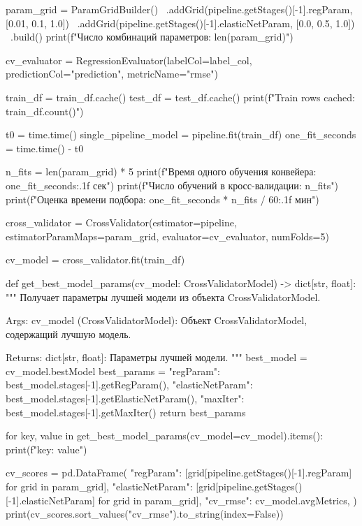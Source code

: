\begin{code}
param_grid = ParamGridBuilder() \
    .addGrid(pipeline.getStages()[-1].regParam, [0.01, 0.1, 1.0]) \
    .addGrid(pipeline.getStages()[-1].elasticNetParam, [0.0, 0.5, 1.0]) \
    .build()
print(f"Число комбинаций параметров: {len(param_grid)}")

cv_evaluator = RegressionEvaluator(labelCol=label_col,
                                   predictionCol="prediction",
                                   metricName="rmse")

train_df = train_df.cache()
test_df = test_df.cache()
print(f"Train rows cached: {train_df.count()}")

t0 = time.time()
single_pipeline_model = pipeline.fit(train_df)
one_fit_seconds = time.time() - t0

n_fits = len(param_grid) * 5
print(f"Время одного обучения конвейера: {one_fit_seconds:.1f} сек")
print(f"Число обучений в кросс-валидации: {n_fits}")
print(f"Оценка времени подбора: {one_fit_seconds * n_fits / 60:.1f} мин")

cross_validator = CrossValidator(estimator=pipeline,
                                 estimatorParamMaps=param_grid,
                                 evaluator=cv_evaluator,
                                 numFolds=5)

cv_model = cross_validator.fit(train_df)

def get_best_model_params(cv_model: CrossValidatorModel) -> dict[str, float]:
    """
    Получает параметры лучшей модели из объекта CrossValidatorModel.

    Args:
        cv_model (CrossValidatorModel): Объект CrossValidatorModel,
            содержащий лучшую модель.

    Returns:
        dict[str, float]: Параметры лучшей модели.
    """
    best_model = cv_model.bestModel
    best_params = {
        "regParam": best_model.stages[-1].getRegParam(),
        "elasticNetParam": best_model.stages[-1].getElasticNetParam(),
        "maxIter": best_model.stages[-1].getMaxIter()
    }
    return best_params

for key, value in get_best_model_params(cv_model=cv_model).items():
    print(f"{key}: {value}")

cv_scores = pd.DataFrame({
    "regParam": [grid[pipeline.getStages()[-1].regParam] for grid in param_grid],
    "elasticNetParam": [grid[pipeline.getStages()[-1].elasticNetParam]
                        for grid in param_grid],
    "cv_rmse": cv_model.avgMetrics,
})
print(cv_scores.sort_values("cv_rmse").to_string(index=False))


\end{code}
